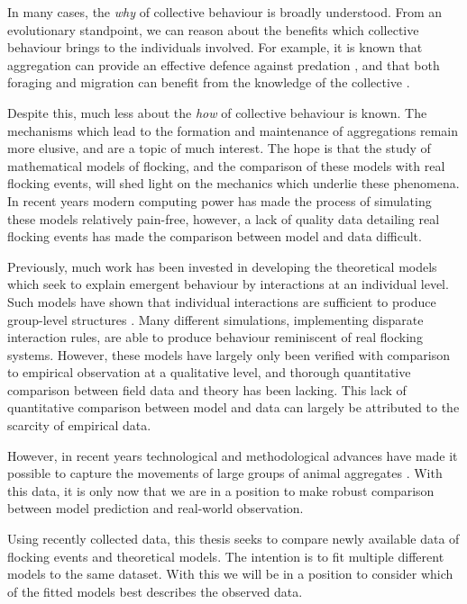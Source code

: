 In many cases, the \emph{why} of collective behaviour is broadly understood.
From an evolutionary standpoint, we can reason about the benefits which
collective behaviour brings to the individuals involved. For example, it is
known that aggregation can provide an effective defence against predation
\parencite{landeau86}, and that both foraging and migration can benefit from
the knowledge of the collective \parencite{simmons04}.

Despite this, much less about the \emph{how} of collective behaviour is known.
The mechanisms which lead to the formation and maintenance of aggregations
remain more elusive, and are a topic of much interest. The hope is that the
study of mathematical models of flocking, and the comparison of these models
with real flocking events, will shed light on the mechanics which underlie
these phenomena. In recent years modern computing power has made the process of
simulating these models relatively pain-free, however, a lack of quality data
detailing real flocking events has made the comparison between model and data
difficult.

Previously, much work has been invested in developing the theoretical models
which seek to explain emergent behaviour by interactions at an individual
level. Such models have shown that individual interactions are sufficient to
produce group-level structures \parencite{aoki82}. Many different simulations,
implementing disparate interaction rules, are able to produce behaviour
reminiscent of real flocking systems. However, these models have largely only
been verified with comparison to empirical observation at a qualitative level,
and thorough quantitative comparison between field data and theory has been
lacking. This lack of quantitative comparison between model and data can
largely be attributed to the scarcity of empirical data.

However, in recent years technological and methodological advances have made it
possible to capture the movements of large groups of animal aggregates
\parencite{ballerini08}. With this data, it is only now that we are in a
position to make robust comparison between model prediction and real-world
observation.

Using recently collected data, this thesis seeks to compare newly available
data of flocking events and theoretical models. The intention is to fit
multiple different models to the same dataset. With this we will be in a
position to consider which of the fitted models best describes the observed
data.

